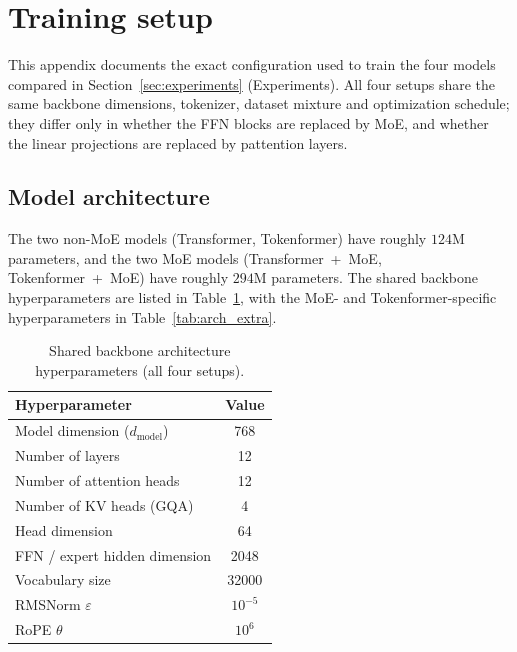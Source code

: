 \documentclass[twoside,11pt]{article}
\begin{document}
\clearpage

\appendix

\section{Training setup}
\label{app:training}

This appendix documents the exact configuration used to train the four models
compared in Section~\ref{sec:experiments} (Experiments). All four setups share the
same backbone dimensions, tokenizer, dataset mixture and optimization schedule;
they differ only in whether the FFN blocks are replaced by MoE, and whether the
linear projections are replaced by pattention layers.

\subsection{Model architecture}

The two non-MoE models (Transformer, Tokenformer) have roughly $124$M parameters,
and the two MoE models (Transformer~+~MoE, Tokenformer~+~MoE) have roughly $294$M
parameters. The shared backbone hyperparameters are listed in Table~\ref{tab:arch},
with the MoE- and Tokenformer-specific hyperparameters in Table~\ref{tab:arch_extra}.

\begin{table}[h]
    \centering
    \begin{tabular}{|l|c|}
        \hline
        Hyperparameter & Value \\
        \hline\hline
        Model dimension ($d_\text{model}$) & 768 \\
        \hline
        Number of layers & 12 \\
        \hline
        Number of attention heads & 12 \\
        \hline
        Number of KV heads (GQA) & 4 \\
        \hline
        Head dimension & 64 \\
        \hline
        FFN / expert hidden dimension & 2048 \\
        \hline
        Vocabulary size & 32000 \\
        \hline
        RMSNorm $\varepsilon$ & $10^{-5}$ \\
        \hline
        RoPE $\theta$ & $10^{6}$ \\
        \hline
    \end{tabular}
    \caption{Shared backbone architecture hyperparameters (all four setups).}
    \label{tab:arch}
\end{table}
\end{document}
